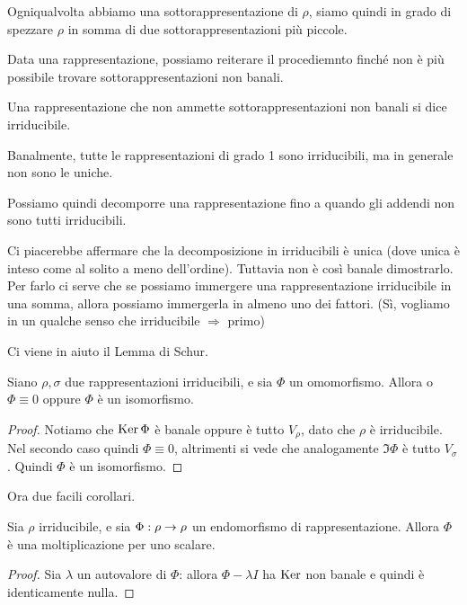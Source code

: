 \documentclass[a4paper,10pt,oneside]{math_article}
\newcommand{\id}{I}
\begin{document}
    Ogniqualvolta abbiamo una sottorappresentazione di $\rho$, siamo quindi in grado di spezzare $\rho$ in somma di due sottorappresentazioni più piccole. 
 
    Data una rappresentazione, possiamo reiterare il procediemnto finché non è più possibile trovare sottorappresentazioni non banali.
    
    \begin{mydef}
      Una rappresentazione che non ammette sottorappresentazioni non banali si dice irriducibile.
    \end{mydef}
    
    Banalmente, tutte le rappresentazioni di grado 1 sono irriducibili, ma in generale non sono le uniche.
    
    Possiamo quindi decomporre una rappresentazione fino a quando gli addendi non sono tutti irriducibili.
    
    Ci piacerebbe affermare che la decomposizione in irriducibili è unica (dove unica è inteso come al solito a meno dell'ordine). Tuttavia non è così banale dimostrarlo. Per farlo ci serve che se possiamo immergere una rappresentazione irriducibile in una somma, allora possiamo immergerla in almeno uno dei fattori. (Sì, vogliamo in un qualche senso che irriducibile $\Rightarrow$ primo)
    
    Ci viene in aiuto il Lemma di Schur.
    
    \begin{mytheorem}
     Siano $\rho,\sigma$ due rappresentazioni irriducibili, e sia $\Phi$ un omomorfismo. Allora o $\Phi \equiv 0$ oppure $\Phi$ è un isomorfismo.
    \end{mytheorem}
    \begin{proof}
     Notiamo che $\operatorname{Ker} \Phi$ è banale oppure è tutto $V_\rho$, dato che $\rho$ è irriducibile. Nel secondo caso quindi $\Phi\equiv 0$, altrimenti si vede che analogamente $\Im \Phi$ è tutto $V_\sigma$. Quindi $\Phi$ è un isomorfismo.
    \end{proof}
    
    Ora due facili corollari.
    
    \begin{mycor}
     Sia $\rho$ irriducibile, e sia $\Phi: \rho \rightarrow \rho$ un endomorfismo di rappresentazione. Allora $\Phi$ è una moltiplicazione per uno scalare. 
    \end{mycor}
    \begin{proof}
      Sia $\lambda$ un autovalore di $\Phi$: allora $\Phi-\lambda\id$ ha $\operatorname{Ker}$ non banale e quindi è identicamente nulla.
    \end{proof}
\end{document}
